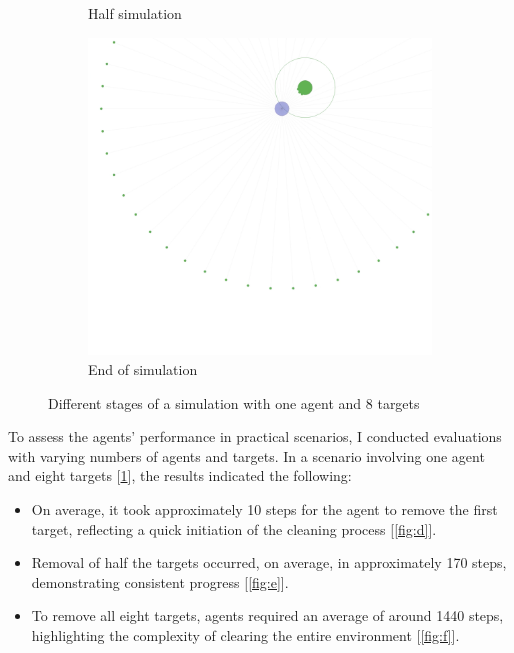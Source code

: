 \documentclass{scrartcl}
\begin{document}
\begin{figure}
\begin{subfigure}[b]{0.45\textwidth}
      \caption{Half simulation}
  \end{subfigure}
  \hfill
  \begin{subfigure}[b]{0.45\textwidth}
      \centering
      \includegraphics[width=\textwidth]{img/1_agent_3.png}
      \caption{End of simulation} 
  \end{subfigure}
  \caption{Different stages of a simulation with one agent and 8 targets}
  \label{fig:m}
\end{figure}

To assess the agents' performance in practical scenarios, I conducted evaluations with varying numbers of agents and targets. In a scenario involving one agent and eight targets [\ref{fig:m}], the results indicated the following:
\begin{itemize}
  \item On average, it took approximately 10 steps for the agent to remove the first target, reflecting a quick initiation of the cleaning process [\ref{fig:d}].
  \item Removal of half the targets occurred, on average, in approximately 170 steps, demonstrating consistent progress [\ref{fig:e}].
  \item To remove all eight targets, agents required an average of around 1440 steps, highlighting the complexity of clearing the entire environment [\ref{fig:f}].
\end{itemize}
\end{document}
